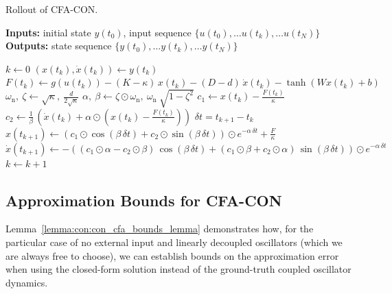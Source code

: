 \begin{algorithm}
\caption{Rollout of \gls{CFA-CON}.}\label{alg:con:con_cfa}
\hspace*{\algorithmicindent} \textbf{Inputs:} initial state $y(t_0)$, input sequence $\{u(t_0), \dots u(t_k), \dots u(t_N) \}$\\
\hspace*{\algorithmicindent} \textbf{Outputs:} state sequence $\{y(t_0), \dots y(t_k), \dots y(t_N) \}$
\begin{algorithmic}[1]
    \State $k \gets 0$
        \State $(x(t_k), \dot{x}(t_k)) \gets y(t_k)$
        \State $F(t_k) \gets g(u(t_k)) - (K - \kappa) \, x(t_k) - (D-d) \, \dot{x}(t_k) - \tanh \left (Wx(t_k)+b \right )$
        \State $\omega_\mathrm{n}, \: \zeta \gets \sqrt{\kappa}, \: \frac{d}{2 \sqrt{\kappa}}$ 
        \State $\alpha, \: \beta  \gets \zeta \odot \omega_\mathrm{n}, \: \omega_\mathrm{n} \: \sqrt{1-\zeta^2}$
        \State $c_{1} \gets x(t_k) - \frac{F(t_k)}{\kappa}$  
        \State $c_{2} \gets \frac{1}{\beta} \, \left ( \dot{x}(t_k) + \alpha \odot \left (x(t_k) - \frac{F(t_k)}{\kappa} \right ) \right )$
        \State $\delta t = t_{k+1} - t_k$  \\
        \State $x(t_{k+1}) \gets  \left ( c_{1} \odot \cos(\beta \, \delta t) +  c_{2} \odot \sin(\beta \, \delta t) \right ) \odot e^{-\alpha \, \delta t} + \frac{F}{\kappa}$
        \State $\dot{x}(t_{k+1}) \gets -\left ( (c_{1} \odot \alpha - c_{2} \odot \beta) \, \cos(\beta \, \delta t) +  (c_{1} \odot \beta + c_{2} \odot \alpha) \, \sin(\beta \, \delta t) \right ) \odot e^{-\alpha \, \delta t}$
        \State $k \gets k+1$  
    \EndWhile
\end{algorithmic}
\end{algorithm}

\subsection{Approximation Bounds for CFA-CON}
Lemma~\ref{lemma:con:con_cfa_bounds_lemma} demonstrates how, for the particular case of no external input and linearly decoupled oscillators (which we are always free to choose), we can establish bounds on the approximation error when using the closed-form solution instead of the ground-truth coupled oscillator dynamics.

